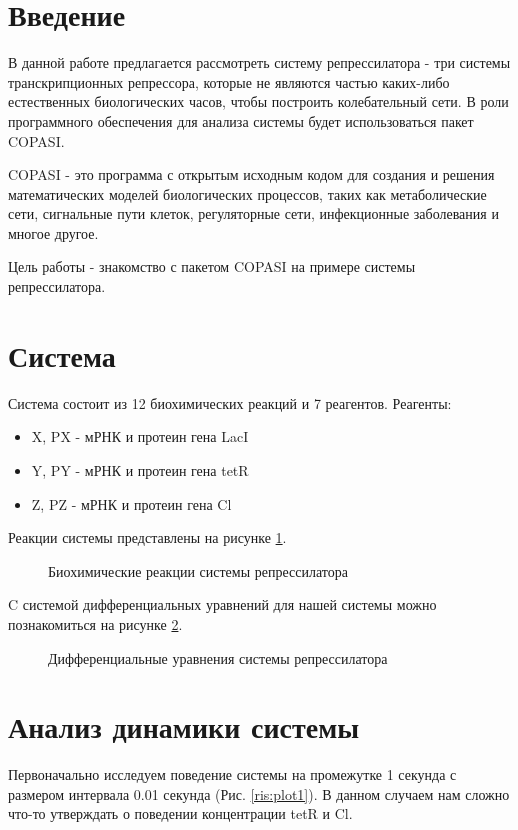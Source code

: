 
\section{Введение}

В данной работе предлагается рассмотреть систему репрессилатора  - три системы транскрипционных репрессора, которые не являются частью
каких-либо естественных биологических часов, чтобы построить колебательный сети. В роли программного обеспечения для анализа системы будет
использоваться пакет COPASI.

COPASI - это программа с открытым исходным кодом для создания и решения математических моделей биологических процессов,
таких как метаболические сети, сигнальные пути клеток, регуляторные сети, инфекционные заболевания и многое другое.

Цель работы - знакомство с пакетом COPASI на примере системы репрессилатора.

\section{Система}
Система состоит из 12 биохимических реакций и 7 реагентов.
Реагенты:
\begin{itemize}
  \item X, PX - мРНК и протеин гена LacI
  \item Y, PY - мРНК и протеин гена tetR
  \item Z, PZ - мРНК и протеин гена Cl
\end{itemize}

Реакции системы представлены на рисунке \ref{ris:reactions}.
\begin{figure}[!h]
\caption{Биохимические реакции системы репрессилатора}
\label{ris:reactions}
\end{figure}

C системой дифференциальных уравнений для нашей системы можно познакомиться на рисунке \ref{ris:equations}.
\begin{figure}[!h]
\caption{Дифференциальные уравнения системы репрессилатора}
\label{ris:equations}
\end{figure}

\section{Анализ динамики системы}
Первоначально исследуем поведение системы на промежутке 1 секунда с размером интервала 0.01 секунда (Рис. \ref{ris:plot1}). В данном случаем
нам сложно что-то утверждать о поведении концентрации tetR и Cl.

